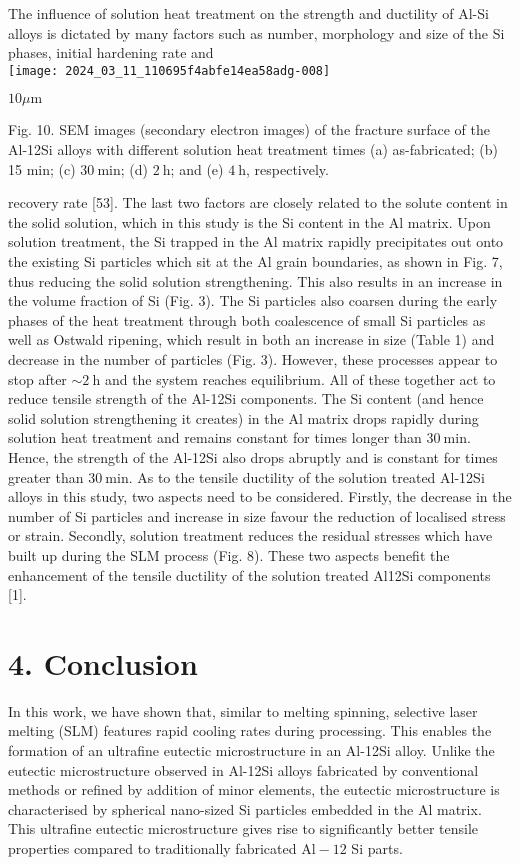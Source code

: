 \documentclass[10pt]{article}
\begin{document}
The influence of solution heat treatment on the strength and ductility of Al-Si alloys is dictated by many factors such as number, morphology and size of the Si phases, initial hardening rate and\\
\texttt{[image: 2024\_03\_11\_110695f4abfe14ea58adg-008]}

$10 \mu \mathrm{m}$

Fig. 10. SEM images (secondary electron images) of the fracture surface of the Al-12Si alloys with different solution heat treatment times (a) as-fabricated; (b) 15 min; (c) $30 \mathrm{~min}$; (d) $2 \mathrm{~h}$; and (e) $4 \mathrm{~h}$, respectively.

recovery rate [53]. The last two factors are closely related to the solute content in the solid solution, which in this study is the Si content in the Al matrix. Upon solution treatment, the Si trapped in the $\mathrm{Al}$ matrix rapidly precipitates out onto the existing Si particles which sit at the Al grain boundaries, as shown in Fig. 7, thus reducing the solid solution strengthening. This also results in an increase in the volume fraction of Si (Fig. 3). The Si particles also coarsen during the early phases of the heat treatment through both coalescence of small Si particles as well as Ostwald ripening, which result in both an increase in size (Table 1) and decrease in the number of particles (Fig. 3). However, these processes appear to stop after $\sim 2 \mathrm{~h}$ and the system reaches equilibrium. All of these together act to reduce tensile strength of the Al-12Si components. The Si content (and hence solid solution strengthening it creates) in the Al matrix drops rapidly during solution heat treatment and remains constant for times longer than $30 \mathrm{~min}$. Hence, the strength of the Al-12Si also drops abruptly and is constant for times greater than $30 \mathrm{~min}$. As to the tensile ductility of the solution treated Al-12Si alloys in this study, two aspects need to be considered. Firstly, the decrease in the number of Si particles and increase in size favour the reduction of localised stress or strain. Secondly, solution treatment reduces the residual stresses which have built up during the SLM process (Fig. 8). These two aspects benefit the enhancement of the tensile ductility of the solution treated Al12Si components [1].

\section*{4. Conclusion}
In this work, we have shown that, similar to melting spinning, selective laser melting (SLM) features rapid cooling rates during processing. This enables the formation of an ultrafine eutectic microstructure in an Al-12Si alloy. Unlike the eutectic microstructure observed in Al-12Si alloys fabricated by conventional methods or refined by addition of minor elements, the eutectic microstructure is characterised by spherical nano-sized Si particles embedded in the Al matrix. This ultrafine eutectic microstructure gives rise to significantly better tensile properties compared to traditionally fabricated $\mathrm{Al}-12$ Si parts.
\end{document}
